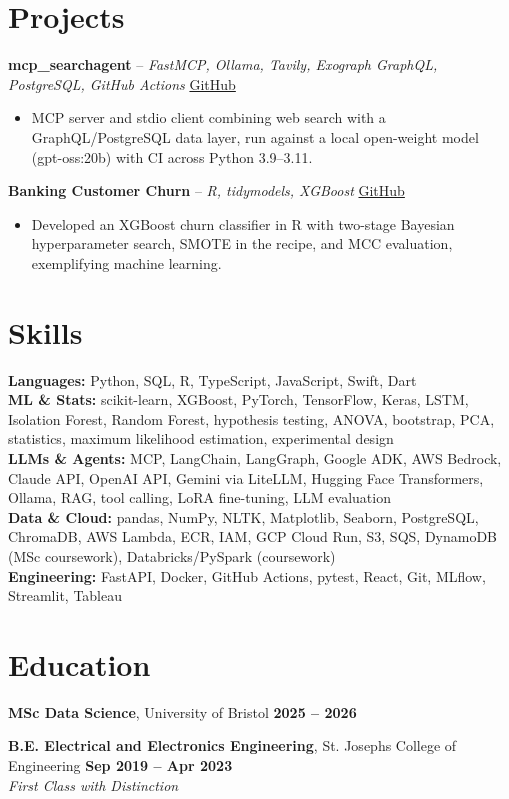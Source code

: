 \documentclass[a4paper,10pt]{article}
\begin{document}
\section{Projects}
\noindent\textbf{mcp\_searchagent} -- \textit{FastMCP, Ollama, Tavily, Exograph GraphQL, PostgreSQL, GitHub Actions} \hfill \href{https://github.com/Thiruvel-AP/mcp_searchagent}{GitHub}
\begin{itemize}
  \item MCP server and stdio client combining web search with a GraphQL/PostgreSQL data layer, run against a local open-weight model (gpt-oss:20b) with CI across Python 3.9–3.11.
\end{itemize}
\noindent\textbf{Banking Customer Churn} -- \textit{R, tidymodels, XGBoost} \hfill \href{https://github.com/Thiruvel-AP/Banking-Customer-Churn-Prediction}{GitHub}
\begin{itemize}
  \item Developed an XGBoost churn classifier in R with two-stage Bayesian hyperparameter search, SMOTE in the recipe, and MCC evaluation, exemplifying machine learning.
\end{itemize}

\section{Skills}
\textbf{Languages:} Python, SQL, R, TypeScript, JavaScript, Swift, Dart\\
\textbf{ML \& Stats:} scikit-learn, XGBoost, PyTorch, TensorFlow, Keras, LSTM, Isolation Forest, Random Forest, hypothesis testing, ANOVA, bootstrap, PCA, statistics, maximum likelihood estimation, experimental design\\
\textbf{LLMs \& Agents:} MCP, LangChain, LangGraph, Google ADK, AWS Bedrock, Claude API, OpenAI API, Gemini via LiteLLM, Hugging Face Transformers, Ollama, RAG, tool calling, LoRA fine-tuning, LLM evaluation\\
\textbf{Data \& Cloud:} pandas, NumPy, NLTK, Matplotlib, Seaborn, PostgreSQL, ChromaDB, AWS Lambda, ECR, IAM, GCP Cloud Run, S3, SQS, DynamoDB (MSc coursework), Databricks/PySpark (coursework)\\
\textbf{Engineering:} FastAPI, Docker, GitHub Actions, pytest, React, Git, MLflow, Streamlit, Tableau

\section{Education}
\textbf{MSc Data Science}, University of Bristol \hfill \textbf{2025 – 2026}\par
\vspace{2pt}
\textbf{B.E. Electrical and Electronics Engineering}, St. Joseph\textquotesingle{}s College of Engineering \hfill \textbf{Sep 2019 – Apr 2023}\\ \textit{First Class with Distinction}\par
\end{document}
